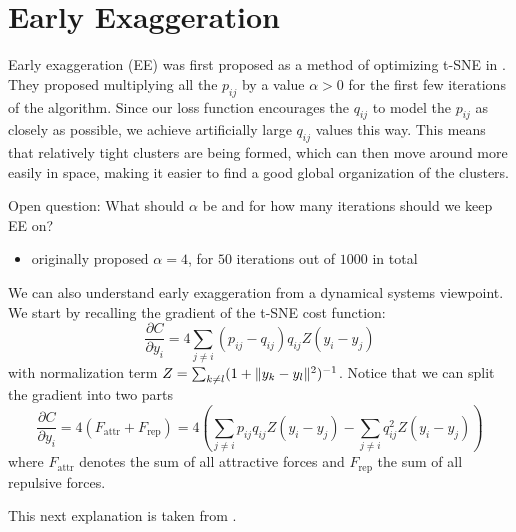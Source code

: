 \section{Early Exaggeration}
Early exaggeration (EE) was first proposed as a method of optimizing t-SNE in \cite{vdMaa08}. They proposed multiplying all the $p_{ij}$ by a value $\alpha > 0$ for the first few iterations of the algorithm. Since our loss function encourages the $q_{ij}$ to model the $p_{ij}$ as closely as possible, we achieve artificially large $q_{ij}$ values this way. This means that relatively tight clusters are being formed, which can then move around more easily in space, making it easier to find a good global organization of the clusters. 

Open question: What should $\alpha$ be and for how many iterations should we keep EE on? 
\begin{itemize}
    \item \cite{vdMaa08} originally proposed $\alpha = 4$, for $50$ iterations out of $1000$ in total 
\end{itemize}

We can also understand early exaggeration from a dynamical systems viewpoint. 
We start by recalling the gradient of the t-SNE cost function: 
\begin{equation}
    \frac{\partial C}{\partial y_i} = 4 \sum_{j \neq i} (p_{ij} - q_{ij}) q_{ij} Z (y_i - y_j)
\end{equation}
with normalization term $Z = \sum_{k \neq l} (1+ \lVert y_k - y_l\rVert^2 )^{-1}$. Notice that we can split the gradient into two parts 
\begin{equation}
    \frac{\partial C}{\partial y_i} = 4 (F_{\text{attr}} + F_{\text{rep}}) = 4 \left( \sum_{j \neq i } p_{ij} q_{ij} Z (y_i - y_j) - \sum_{j \neq i} q_{ij}^2 Z (y_i - y_j) \right) 
\end{equation}
where $F_{\text{attr}}$ denotes the sum of all attractive forces and $F_{\text{rep}}$ the sum of all repulsive forces. 

This next explanation is taken from \cite{LinStei22}.

